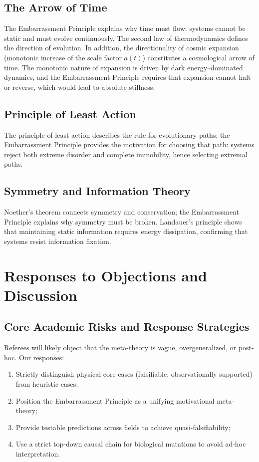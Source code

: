 \documentclass[10pt,a4paper]{article}
\begin{document}
\subsection{The Arrow of Time}
The Embarrassment Principle explains why time must flow: systems cannot be static and must evolve continuously. The second law of thermodynamics defines the direction of evolution. In addition, the directionality of cosmic expansion (monotonic increase of the scale factor $a(t)$) constitutes a cosmological arrow of time. The monotonic nature of expansion is driven by dark energy–dominated dynamics, and the Embarrassment Principle requires that expansion cannot halt or reverse, which would lead to absolute stillness.

\subsection{Principle of Least Action}
The principle of least action describes the rule for evolutionary paths; the Embarrassment Principle provides the motivation for choosing that path: systems reject both extreme disorder and complete immobility, hence selecting extremal paths.

\subsection{Symmetry and Information Theory}
Noether’s theorem connects symmetry and conservation; the Embarrassment Principle explains why symmetry must be broken. Landauer’s principle shows that maintaining static information requires energy dissipation, confirming that systems resist information fixation.

\section{Responses to Objections and Discussion}

\subsection{Core Academic Risks and Response Strategies}
Referees will likely object that the meta-theory is vague, overgeneralized, or post-hoc. Our responses:
\begin{enumerate}[noitemsep]
\item Strictly distinguish physical core cases (falsifiable, observationally supported) from heuristic cases;
\item Position the Embarrassment Principle as a unifying motivational meta-theory;
\item Provide testable predictions across fields to achieve quasi-falsifiability;
\item Use a strict top-down causal chain for biological mutations to avoid ad-hoc interpretation.
\end{enumerate}
\end{document}
